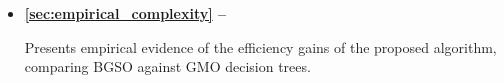 \begin{mdframed}[frametitle={Related experiments}]

   \begin{itemize}
    \item \textbf{\autoref{sec:empirical_complexity} -- }

        Presents empirical evidence of the efficiency gains of the proposed algorithm, comparing BGSO against GMO decision trees.
   \end{itemize}
\end{mdframed}


%
%
